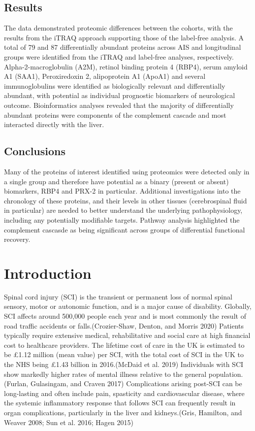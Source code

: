 \documentclass[9pt,lineno]{elife}
\begin{document}
\hypertarget{results}{%
\subsection{Results}\label{results}}

The data demonstrated proteomic differences between the cohorts, with the results from the iTRAQ approach supporting those of the label-free analysis.
A total of 79 and 87 differentially abundant proteins across AIS and longitudinal groups were identified from the iTRAQ and label-free analyses, respectively.
Alpha-2-macroglobulin (A2M), retinol binding protein 4 (RBP4), serum amyloid A1 (SAA1), Peroxiredoxin 2, alipoprotein A1 (ApoA1) and several immunoglobulins were identified as biologically relevant and differentially abundant, with potential as individual prognostic biomarkers of neurological outcome.
Bioinformatics analyses revealed that the majority of differentially abundant proteins were components of the complement cascade and most interacted directly with the liver.

\hypertarget{conclusions}{%
\subsection{Conclusions}\label{conclusions}}

Many of the proteins of interest identified using proteomics were detected only in a single group and therefore have potential as a binary (present or absent) biomarkers, RBP4 and PRX-2 in particular.
Additional investigations into the chronology of these proteins, and their levels in other tissues (cerebrospinal fluid in particular) are needed to better understand the underlying pathophysiology, including any potentially modifiable targets.
Pathway analysis highlighted the complement cascasde as being significant across groups of differential functional recovery.

\hypertarget{introduction-1}{%
\section{Introduction}\label{introduction-1}}

Spinal cord injury (SCI) is the transient or permanent loss of normal spinal sensory, motor or autonomic function, and is a major cause of disability.
Globally, SCI affects around 500,000 people each year and is most commonly the result of road traffic accidents or falls.(Crozier-Shaw, Denton, and Morris 2020) Patients typically require extensive medical, rehabilitative and social care at high financial cost to healthcare providers. The lifetime cost of care in the UK is estimated to be £1.12 million (mean value) per SCI, with the total cost of SCI in the UK to the NHS being £1.43 billion in 2016.(McDaid et al. 2019) Individuals with SCI show markedly higher rates of mental illness relative to the general population.(Furlan, Gulasingam, and Craven 2017) Complications arising post-SCI can be long-lasting and often include pain, spasticity and cardiovascular disease, where the systemic inflammatory response that follows SCI can frequently result in organ complications, particularly in the liver and kidneys.(Gris, Hamilton, and Weaver 2008; Sun et al. 2016; Hagen 2015)
\end{document}
